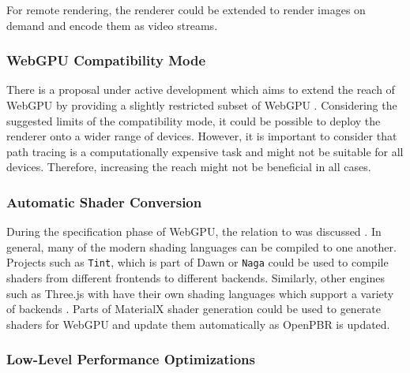 For remote rendering, the renderer could be extended to render images on demand and encode them as video streams.

\subsubsection*{WebGPU Compatibility Mode}

There is a proposal under active development which aims to extend the reach of \gls{WebGPU} by providing a slightly restricted subset of \gls{WebGPU} \cite{WebGPUCompatibilityModeProposal}. Considering the suggested limits of the compatibility mode, it could be possible to deploy the renderer onto a wider range of devices. However, it is important to consider that path tracing is a computationally expensive task and might not be suitable for all devices. Therefore, increasing the reach might not be beneficial in all cases.

\subsubsection*{Automatic Shader Conversion}

During the specification phase of \gls{WebGPU}, the relation to  was discussed \cite{webGPUSpirVRelation}. In general, many of the modern shading languages can be compiled to one another. Projects such as \texttt{Tint}, which is part of \gls{Dawn} \cite{dawnImplementation} or \texttt{Naga} \cite{nagaImplementation} could be used to compile shaders from different frontends to different backends. Similarly, other engines such as \gls{Three.js} with  have their own shading languages which support a variety of backends \cite{ThreeJSShadingLanguage}. Parts of \gls{MaterialX} shader generation could be used to generate shaders for \gls{WebGPU} and update them automatically as \gls{OpenPBR} is updated.

\subsubsection*{Low-Level Performance Optimizations}

